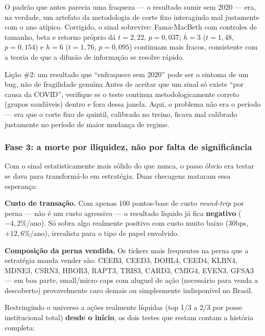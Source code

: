 \documentclass[11pt,a4paper]{article}
\begin{document}
O padrão que antes parecia uma fraqueza --- o resultado sumir sem 2020 ---
era, na verdade, um artefato da metodologia de corte fixo interagindo mal
justamente com o ano atípico. Corrigido, o sinal sobrevive: Fama-MacBeth
com controles de tamanho, beta e retorno próprio dá $t=2{,}22$,
$p=0{,}037$; $h=3$ ($t=1{,}48$, $p=0{,}154$) e $h=6$ ($t=1{,}76$,
$p=0{,}095$) continuam mais fracos, consistente com a teoria de que a
difusão de informação se resolve rápido.

\begin{licao}{Lição \#2: um resultado que ``enfraquece sem 2020'' pode ser o sintoma de um bug, não de fragilidade genuína}
Antes de aceitar que um sinal só existe ``por causa da COVID'', verifique
se o teste continua metodologicamente correto (grupos saudáveis) dentro e
fora dessa janela. Aqui, o problema não era o período --- era que o corte
fixo de quintil, calibrado no treino, ficava mal calibrado justamente no
período de maior mudança de regime.
\end{licao}

\subsubsection{Fase 3: a morte por iliquidez, não por falta de significância}

Com o sinal estatisticamente mais sólido do que nunca, o passo óbvio era
testar se dava para transformá-lo em estratégia. Duas checagens mataram
essa esperança:

\textbf{Custo de transação.} Com apenas 100 pontos-base de custo
\emph{round-trip} por perna --- não é um custo agressivo --- o resultado
líquido já fica \textbf{negativo} ($-4{,}2\%$/ano). Só sobra algo
realmente positivo com custo muito baixo (30bps, $+12{,}6\%$/ano),
irrealista para o tipo de papel envolvido.

\textbf{Composição da perna vendida.} Os tickers mais frequentes na perna
que a estratégia manda vender são: CEEB3, CEED3, DOHL4, CEED4, KLBN4,
MDNE3, CSRN3, HBOR3, RAPT3, TRIS3, CARD3, CMIG4, EVEN3, GFSA3 --- em boa
parte, small/micro caps com aluguel de ação (necessário para venda a
descoberto) provavelmente caro demais ou simplesmente indisponível no
Brasil.

Restringindo o universo a ações realmente líquidas (top 1/3 a 2/3 por
posse institucional total) \textbf{desde o início}, os dois testes que
restam contam a história completa:
\end{document}
